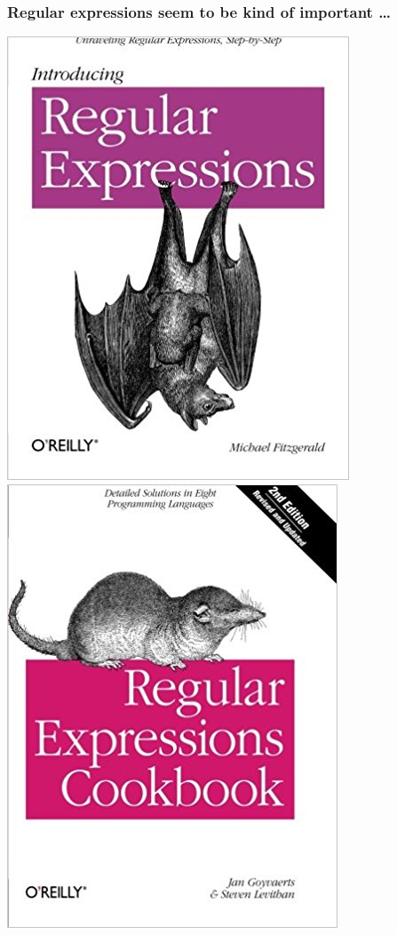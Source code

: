 \documentclass[pdftex,aspectratio=169]{beamer}
\begin{document}
\begin{frame}
  \frametitle{Regular expressions seem to be kind of important \dots}
  \begin{center}
    \includegraphics[scale=0.25]{book-introducing-regular-expressions}
    \includegraphics[scale=0.25]{book-regular-expression-cookbook}

\end{center}
\end{frame}
\end{document}
